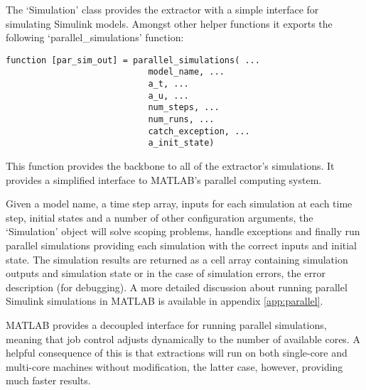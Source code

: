 The `Simulation' class provides the extractor with a simple interface for simulating Simulink models. Amongst other helper functions it exports the following `parallel\_simulations' function:

\begin{verbatim}
function [par_sim_out] = parallel_simulations( ...
                            model_name, ...
                            a_t, ...
                            a_u, ...
                            num_steps, ...
                            num_runs, ...
                            catch_exception, ...
                            a_init_state)
\end{verbatim}

This function provides the backbone to all of the extractor's simulations. It provides a simplified interface to MATLAB's parallel computing system.

Given a model name, a time step array, inputs for each simulation at each time step, initial states and a number of other configuration arguments, the `Simulation' object will solve scoping problems, handle exceptions and finally run parallel simulations providing each simulation with the correct inputs and initial state. The simulation results are returned as a cell array containing simulation outputs and simulation state or in the case of simulation errors, the error description (for debugging). A more detailed discussion about running parallel Simulink simulations in MATLAB is available in appendix \ref{app:parallel}.

MATLAB provides a decoupled interface for running parallel simulations, meaning that job control adjusts dynamically to the number of available cores. A helpful consequence of this is that extractions will run on both single-core and multi-core machines without modification, the latter case, however, providing much faster results.



